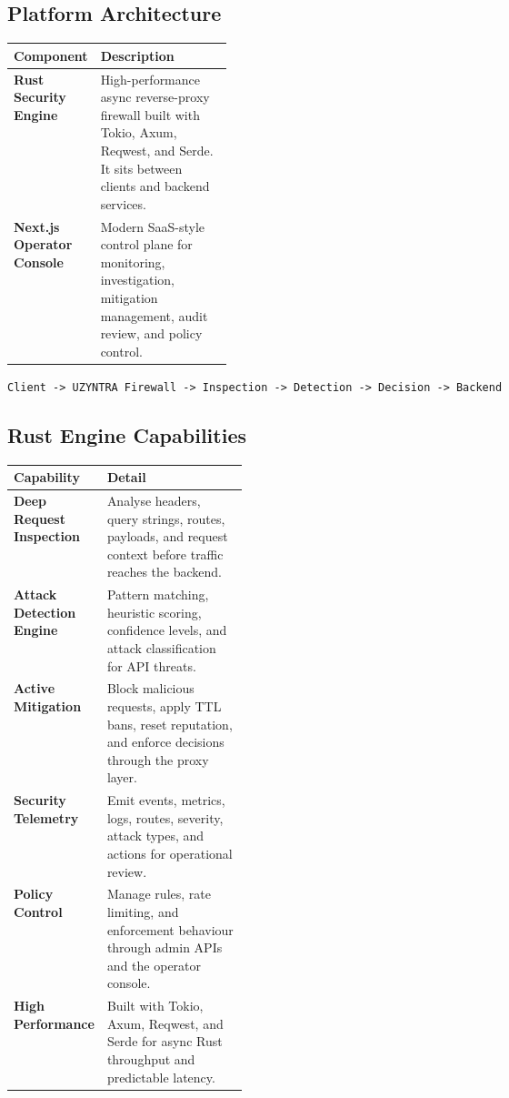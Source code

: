 \documentclass[11pt,a4paper]{article}
\begin{document}
\subsection{Platform Architecture}
\begin{tabularx}{\linewidth}{@{}>{\bfseries}p{0.28\linewidth}X@{}}
\toprule
Component & Description \\
\midrule
Rust Security Engine & High-performance async reverse-proxy firewall built with Tokio, Axum, Reqwest, and Serde. It sits between clients and backend services. \\
Next.js Operator Console & Modern SaaS-style control plane for monitoring, investigation, mitigation management, audit review, and policy control. \\
\bottomrule
\end{tabularx}

\begin{infobox}
\centering\sffamily\small\texttt{Client -> UZYNTRA Firewall -> Inspection -> Detection -> Decision -> Backend}
\end{infobox}

\subsection{Rust Engine Capabilities}
\begin{tabularx}{\linewidth}{@{}>{\bfseries}p{0.30\linewidth}X@{}}
\toprule
Capability & Detail \\
\midrule
Deep Request Inspection & Analyse headers, query strings, routes, payloads, and request context before traffic reaches the backend. \\
Attack Detection Engine & Pattern matching, heuristic scoring, confidence levels, and attack classification for API threats. \\
Active Mitigation & Block malicious requests, apply TTL bans, reset reputation, and enforce decisions through the proxy layer. \\
Security Telemetry & Emit events, metrics, logs, routes, severity, attack types, and actions for operational review. \\
Policy Control & Manage rules, rate limiting, and enforcement behaviour through admin APIs and the operator console. \\
High Performance & Built with Tokio, Axum, Reqwest, and Serde for async Rust throughput and predictable latency. \\
\bottomrule
\end{tabularx}
\end{document}

